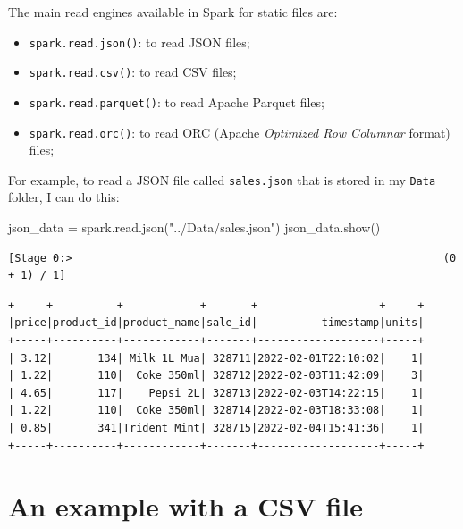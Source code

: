 \documentclass[
  11pt,
  letterpaper,
  DIV=11,
  numbers=noendperiod]{scrreprt}
\newenvironment{Shaded}{\begin{snugshade}}{\end{snugshade}}
\newcommand{\NormalTok}[1]{\textcolor[rgb]{0.00,0.23,0.31}{#1}}
\newcommand{\OperatorTok}[1]{\textcolor[rgb]{0.37,0.37,0.37}{#1}}
\newcommand{\StringTok}[1]{\textcolor[rgb]{0.13,0.47,0.30}{#1}}
\providecommand{\tightlist}{%
  \setlength{\itemsep}{0pt}\setlength{\parskip}{0pt}}\usepackage{longtable,booktabs,array}
\begin{document}
The main read engines available in Spark for static files are:

\begin{itemize}
\tightlist
\item
  \texttt{spark.read.json()}: to read JSON files;
\item
  \texttt{spark.read.csv()}: to read CSV files;
\item
  \texttt{spark.read.parquet()}: to read Apache Parquet files;
\item
  \texttt{spark.read.orc()}: to read ORC (Apache \emph{Optimized Row
  Columnar} format) files;
\end{itemize}

For example, to read a JSON file called \texttt{sales.json} that is
stored in my \texttt{Data} folder, I can do this:

\begin{Shaded}
\begin{Highlighting}[]
\NormalTok{json\_data }\OperatorTok{=}\NormalTok{ spark.read.json(}\StringTok{"../Data/sales.json"}\NormalTok{)}
\NormalTok{json\_data.show()}
\end{Highlighting}
\end{Shaded}

\begin{verbatim}
[Stage 0:>                                                          (0 + 1) / 1]                                                                                
\end{verbatim}

\begin{verbatim}
+-----+----------+------------+-------+-------------------+-----+
|price|product_id|product_name|sale_id|          timestamp|units|
+-----+----------+------------+-------+-------------------+-----+
| 3.12|       134| Milk 1L Mua| 328711|2022-02-01T22:10:02|    1|
| 1.22|       110|  Coke 350ml| 328712|2022-02-03T11:42:09|    3|
| 4.65|       117|    Pepsi 2L| 328713|2022-02-03T14:22:15|    1|
| 1.22|       110|  Coke 350ml| 328714|2022-02-03T18:33:08|    1|
| 0.85|       341|Trident Mint| 328715|2022-02-04T15:41:36|    1|
+-----+----------+------------+-------+-------------------+-----+
\end{verbatim}

\hypertarget{an-example-with-a-csv-file}{%
\section{An example with a CSV file}\label{an-example-with-a-csv-file}}
\end{document}
